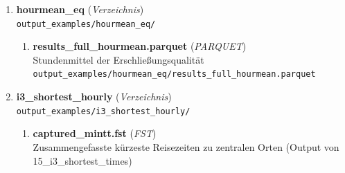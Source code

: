\begin{enumerate}[label=A\arabic*, ref=A\arabic*, leftmargin=*, itemsep=0.5em, topsep=0.3em]
\begin{enumerate}[label=A\arabic{enumi}-\arabic*, ref=A\arabic{enumi}-\arabic*, leftmargin=*, itemsep=0.5em, topsep=0.3em]
\texttt{\small output\_examples/hourly\_eq/}
\edef\appendixlabelkey{app:A\arabic{enumi}-\arabic{enumii}}
\expandafter\label\expandafter{\appendixlabelkey}
\begin{enumerate}[label=A\arabic{enumi}-\arabic{enumii}-\arabic*, ref=A\arabic{enumi}-\arabic{enumii}-\arabic*, leftmargin=*, itemsep=0.5em, topsep=0.3em]
\item \textbf{results\_full\_hour.parquet} \textnormal{(\textit{PARQUET})}\\
Stündliche Erschließungsqualität\\
\texttt{\small output\_examples/hourly\_eq/results\_full\_hour.parquet}
\edef\appendixlabelkey{app:A\arabic{enumi}-\arabic{enumii}-\arabic{enumiii}}
\expandafter\label\expandafter{\appendixlabelkey}
\end{enumerate}
\item \textbf{hourmean\_eq} \textnormal{(\textit{Verzeichnis})}\\
\texttt{\small output\_examples/hourmean\_eq/}
\edef\appendixlabelkey{app:A\arabic{enumi}-\arabic{enumii}}
\expandafter\label\expandafter{\appendixlabelkey}
\begin{enumerate}[label=A\arabic{enumi}-\arabic{enumii}-\arabic*, ref=A\arabic{enumi}-\arabic{enumii}-\arabic*, leftmargin=*, itemsep=0.5em, topsep=0.3em]
\item \textbf{results\_full\_hourmean.parquet} \textnormal{(\textit{PARQUET})}\\
Stundenmittel der Erschließungsqualität\\
\texttt{\small output\_examples/hourmean\_eq/results\_full\_hourmean.parquet}
\edef\appendixlabelkey{app:A\arabic{enumi}-\arabic{enumii}-\arabic{enumiii}}
\expandafter\label\expandafter{\appendixlabelkey}
\end{enumerate}
\item \textbf{i3\_shortest\_hourly} \textnormal{(\textit{Verzeichnis})}\\
\texttt{\small output\_examples/i3\_shortest\_hourly/}
\edef\appendixlabelkey{app:A\arabic{enumi}-\arabic{enumii}}
\expandafter\label\expandafter{\appendixlabelkey}
\begin{enumerate}[label=A\arabic{enumi}-\arabic{enumii}-\arabic*, ref=A\arabic{enumi}-\arabic{enumii}-\arabic*, leftmargin=*, itemsep=0.5em, topsep=0.3em]
\item \textbf{captured\_mintt.fst} \textnormal{(\textit{FST})}\\
Zusammengefasste kürzeste Reisezeiten zu zentralen Orten (Output von 15\_i3\_shortest\_times)\\

\end{enumerate}
\end{enumerate}
\end{enumerate}
